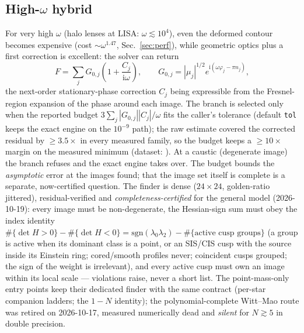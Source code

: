 \documentclass[11pt,a4paper]{article}
\newcommand{\Fresnel}{F}
\newcommand{\ii}{\mathrm{i}}
\begin{document}
\subsection{High-\texorpdfstring{$\omega$}{omega} hybrid}
For very high $\omega$ (halo lenses at LISA: $\omega \lesssim 10^4$), even
the deformed contour becomes expensive (cost $\sim\omega^{1.47}$,
Sec.~\ref{sec:perf}), while geometric optics plus a first correction is
excellent: the solver can return
\begin{equation}
  \Fresnel = \sum_j G_{0,j}\left(1 + \frac{C_j}{\ii\omega}\right),
  \qquad
  G_{0,j} = |\mu_j|^{1/2} e^{\ii(\omega\varphi_j-\pi n_j)},
  \label{eq:hybrid}
\end{equation}
the next-order stationary-phase correction $C_j$ being expressible from the
Fresnel-region expansion of the phase around each image.  The branch is
selected only when the reported budget
$3\sum_j |G_{0,j}||C_j|/\omega$ fits the caller's tolerance (default
\texttt{tol} keeps the exact engine on the $10^{-9}$ path); the raw estimate
covered the corrected residual by $\ge 3.5\times$ in every measured family,
so the budget keeps a $\ge 10\times$ margin on the measured minimum
(dataset: ).  At a caustic
(degenerate image) the branch refuses and the exact
engine takes over.  The budget bounds the
\emph{asymptotic} error at the images found; that the image set itself is
complete is a separate, now-certified question.  The finder is dense
($24\times24$, golden-ratio jittered), residual-verified and
\emph{completeness-certified} for the general model (2026-10-19): every
image must be non-degenerate, the Hessian-sign sum must obey the index
identity $\#\{\det H>0\}-\#\{\det H<0\}=\mathrm{sgn}(\lambda_0\lambda_2)
-\#\{\text{active cusp groups}\}$ (a group is active when its dominant class
is a point, or an SIS/CIS cusp with the source inside its Einstein ring;
cored/smooth profiles never; coincident cusps grouped; the sign of the weight
is irrelevant), and every active cusp must own an image
within its local scale --- violations raise, never a short list.  The
point-mass-only entry points keep their dedicated finder with the same
contract (per-star companion ladders; the $1-N$ identity); the
polynomial-complete Witt--Mao route was retired on 2026-10-17, measured
numerically dead and \emph{silent} for $N\gtrsim5$ in double precision.
\end{document}
